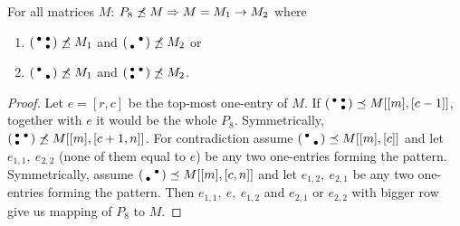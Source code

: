 \begin{lemma}
\label{lemma:p72}
For all matrices $M$: $P_8\not\preceq M\Rightarrow M=M_1\rightarrow M_2$ where
\begin{enumerate}
\item $\left(\begin{smallmatrix}\bullet&\bullet\\ &\bullet\end{smallmatrix}\right)\not\preceq M_1$ and $\left(\begin{smallmatrix} &\bullet\\\bullet& \end{smallmatrix}\right)\not\preceq M_2$ or
\item $\left(\begin{smallmatrix}\bullet& \\ &\bullet\end{smallmatrix}\right)\not\preceq M_1$ and $\left(\begin{smallmatrix}\bullet&\bullet\\\bullet& \end{smallmatrix}\right)\not\preceq M_2$.
\end{enumerate}
\end{lemma}
\begin{proof}
Let $e=[r,c]$ be the top-most one-entry of $M$. If $\left(\begin{smallmatrix}\bullet&\bullet\\ &\bullet\end{smallmatrix}\right)\preceq M[[m],[c-1]]$, together with $e$ it would be the whole $P_8$. Symmetrically, $\left(\begin{smallmatrix}\bullet&\bullet\\\bullet& \end{smallmatrix}\right)\not\preceq M[[m],[c+1,n]]$. For contradiction assume $\left(\begin{smallmatrix}\bullet& \\ &\bullet\end{smallmatrix}\right)\preceq M[[m],[c]]$ and let $e_{1,1},\ e_{2,2}$ (none of them equal to $e$) be any two one-entries forming the pattern. Symmetrically, assume $\left(\begin{smallmatrix} &\bullet\\\bullet& \end{smallmatrix}\right)\preceq M[[m],[c,n]]$ and let $e_{1,2},\ e_{2,1}$ be any two one-entries forming the pattern. Then $e_{1,1},\ e,\ e_{1,2}$ and $e_{2,1}$ or $e_{2,2}$ with bigger row give us mapping of $P_8$ to $M$.
\end{proof}

